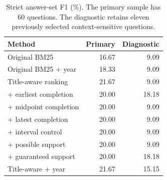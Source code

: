 \begin{table}[t]
\centering\small
\begin{tabular}{@{}lrr@{}}
\toprule
Method & Primary & Diagnostic\\
\midrule
Original BM25 & 16.67 & 9.09\\
Original BM25 + year & 18.33 & 9.09\\
Title-aware ranking & 21.67 & 9.09\\
\quad + earliest completion & 20.00 & 18.18\\
\quad + midpoint completion & 20.00 & 9.09\\
\quad + latest completion & 20.00 & 9.09\\
\quad + interval control & 20.00 & 9.09\\
\quad + possible support & 20.00 & 9.09\\
\quad + guaranteed support & 20.00 & 18.18\\
Title-aware + year & 21.67 & 15.15\\
\bottomrule
\end{tabular}
\caption{Strict answer-set F1 (\%). The primary sample has 60 questions. The diagnostic retains eleven previously selected context-sensitive questions.}
\label{tab:reader_main}
\end{table}
